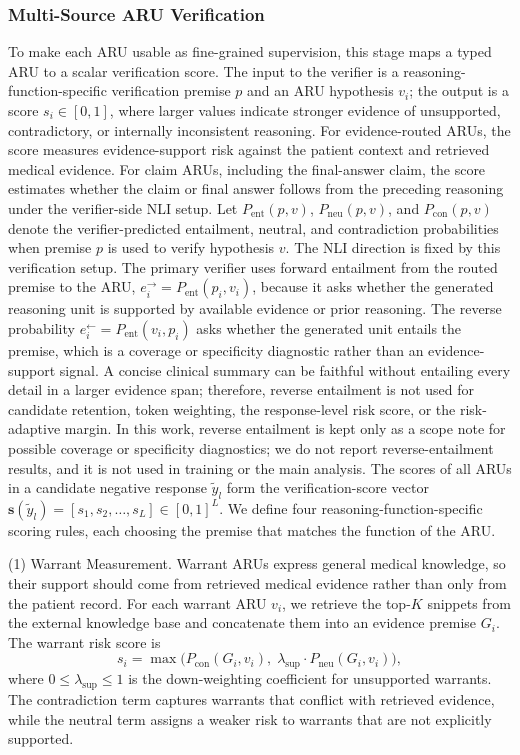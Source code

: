 \documentclass[a4paper,fleqn,doubleblind]{cas-sc}
\begin{document}
\subsubsection{Multi-Source ARU Verification}
\label{sec:verification}
To make each ARU usable as fine-grained supervision, this stage maps a typed ARU to a scalar verification score. The input to the verifier is a reasoning-function-specific verification premise $p$ and an ARU hypothesis $v_i$; the output is a score $s_i \in [0,1]$, where larger values indicate stronger evidence of unsupported, contradictory, or internally inconsistent reasoning. For evidence-routed ARUs, the score measures evidence-support risk against the patient context and retrieved medical evidence. For claim ARUs, including the final-answer claim, the score estimates whether the claim or final answer follows from the preceding reasoning under the verifier-side NLI setup. Let $P_{\text{ent}}(p,v)$, $P_{\text{neu}}(p,v)$, and $P_{\text{con}}(p,v)$ denote the verifier-predicted entailment, neutral, and contradiction probabilities when premise $p$ is used to verify hypothesis $v$. The NLI direction is fixed by this verification setup. The primary verifier uses forward entailment from the routed premise to the ARU, $e_i^{\rightarrow}=P_{\text{ent}}(p_i,v_i)$, because it asks whether the generated reasoning unit is supported by available evidence or prior reasoning. The reverse probability $e_i^{\leftarrow}=P_{\text{ent}}(v_i,p_i)$ asks whether the generated unit entails the premise, which is a coverage or specificity diagnostic rather than an evidence-support signal. A concise clinical summary can be faithful without entailing every detail in a larger evidence span; therefore, reverse entailment is not used for candidate retention, token weighting, the response-level risk score, or the risk-adaptive margin. In this work, reverse entailment is kept only as a scope note for possible coverage or specificity diagnostics; we do not report reverse-entailment results, and it is not used in training or the main analysis. The scores of all ARUs in a candidate negative response $\tilde{y}_l$ form the verification-score vector $\mathbf{s}(\tilde{y}_l)=[s_1,s_2,\dots,s_L]\in[0,1]^L$. We define four reasoning-function-specific scoring rules, each choosing the premise that matches the function of the ARU.

(1) Warrant Measurement.
Warrant ARUs express general medical knowledge, so their support should come from retrieved medical evidence rather than only from the patient record. For each warrant ARU $v_i$, we retrieve the top-$K$ snippets from the external knowledge base and concatenate them into an evidence premise $G_i$. The warrant risk score is
\begin{equation}
\label{eq:knowledge_score}
    s_i = \max \Big( P_{\text{con}}(G_i, v_i),\; \lambda_{\text{sup}} \cdot P_{\text{neu}}(G_i, v_i) \Big),
\end{equation}
where $0 \le \lambda_{\text{sup}} \le 1$ is the down-weighting coefficient for unsupported warrants. The contradiction term captures warrants that conflict with retrieved evidence, while the neutral term assigns a weaker risk to warrants that are not explicitly supported.
\end{document}
